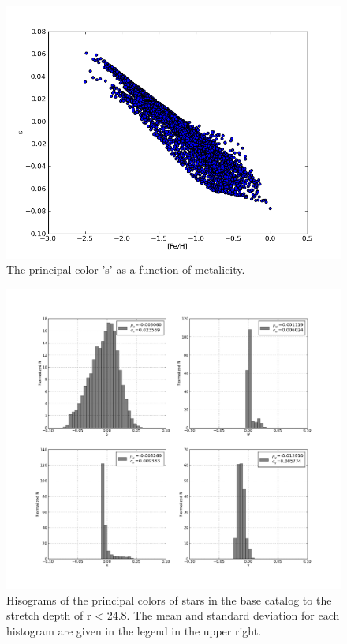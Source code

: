 \documentclass[]{article}
\begin{document}
\begin{figure}
\centering
\includegraphics[width=5in]{validation_figures/s_met.png}
\caption{The principal color 's' as a function of metalicity.\label{fig:sfeh}}
\end{figure}

\begin{figure}
\centering
\includegraphics[width=5in]{validation_figures/principal_colors_hist.png}
\caption{Hisograms of the principal colors of stars in the base catalog to the stretch depth of r < 24.8. The mean and standard deviation for each 
histogram are given in the legend in the upper right.\label{fig:principalcolorshist}}
\end{figure}
\clearpage
\end{document}
